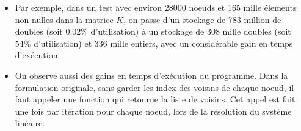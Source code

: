 \begin{itemize}
	\item Par exemple, dans un test avec environ \(28000\) noeuds et 165 mille élements non nulles dans la matrice \(K\), on passe d'un stockage de 783 million de doubles (soit 0.02\% d'utilisation) à un stockage de 308 mille doubles (soit 54\% d'utilisation) et 336 mille entiers, avec un considérable gain en temps d'exécution.
	\item On observe aussi des gains en temps d'exécution du programme. Dans la formulation originale, sans garder les index des voisins de chaque noeud, il faut appeler une fonction qui retourne la liste de voisins. Cet appel est fait une fois par itération pour chaque noeud, lors de la résolution du système linéaire.
\end{itemize}